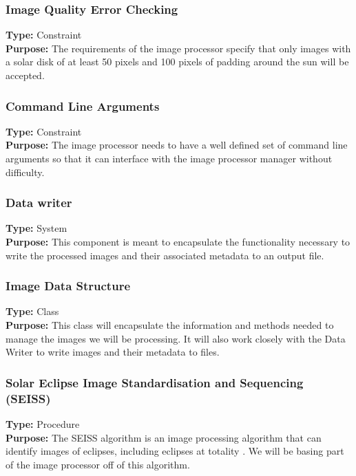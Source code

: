 \documentclass[10pt, onecolumn, draftclsnofoot, letterpaper, compsoc]{IEEEtran}
\begin{document}
\subsubsection{Image Quality Error Checking}
\textbf{Type:} Constraint\\
\textbf{Purpose:} The requirements of the image processor specify that only
images with a solar disk of at least 50 pixels and 100 pixels of padding around
the sun will be accepted.\\

\subsubsection{Command Line Arguments}
\textbf{Type:} Constraint\\
\textbf{Purpose:} The image processor needs to have a well defined set of
command line arguments so that it can interface with the image processor
manager without difficulty. \\

\subsubsection{Data writer}
\textbf{Type:} System\\
\textbf{Purpose:} This component is meant to encapsulate the functionality
necessary to write the processed images and their associated metadata to an
output file.\\

\subsubsection{Image Data Structure}
\textbf{Type:} Class\\
\textbf{Purpose:} This class will encapsulate the information and methods needed
to manage the images we will be processing. It will also work closely with the
Data Writer to write images and their metadata to files.\\

\subsubsection{Solar Eclipse Image Standardisation and Sequencing (SEISS)}
\textbf{Type:} Procedure\\
\textbf{Purpose:} The SEISS algorithm is an image processing algorithm that can
identify images of eclipses, including eclipses at totality \cite{imgKrista}. We
will be basing part of the image processor off of this algorithm. \\
\end{document}
